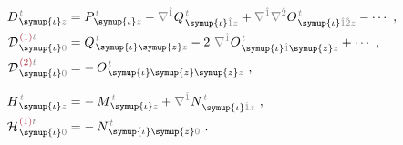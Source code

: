 \begin{subequations} \label{eq:DH^(2-0)_0=}
\begin{align}
	D^{\;\!\mathcolor{gray}{t}}_{\;\! \symup{\iota}\mathcolor{gray}{z}} &= P^{\;\!\mathcolor{gray}{t}}_{\;\! \symup{\iota}\mathcolor{gray}{z}} - \mathcolor{gray}{\nabla^{\hat{1}}} Q^{\;\!\mathcolor{gray}{t}}_{\;\! \symup{\iota} \mathcolor{gray}{\hat{1}} \mathcolor{gray}{z}} + \mathcolor{gray}{\nabla^{\hat{1}}} \mathcolor{gray}{\nabla^{\hat{2}}} O^{\;\!\mathcolor{gray}{t}}_{\;\! \symup{\iota} \mathcolor{gray}{\hat{1}\hat{2}} \mathcolor{gray}{z}} - \cdots~, \label{eq:D^(0)=} \\
	{\mathcal{D}}^{\;\!\textcolor{Maroon}{(1)}\mathcolor{gray}{t}}_{\;\! \symup{\iota}\mathcolor{gray}{0}} &= Q^{\;\!\mathcolor{gray}{t}}_{\;\! \symup{\iota}\symup{z}\mathcolor{gray}{z}} - 2~ \mathcolor{gray}{\nabla^{\hat{1}}} O^{\;\!\mathcolor{gray}{t}}_{\;\! \symup{\iota} \mathcolor{gray}{\hat{1}} \symup{z}\mathcolor{gray}{z}} + \cdots~, \label{eq:D^(1)_0=} \\
	{\mathcal{D}}^{\;\!\textcolor{Maroon}{(2)}\mathcolor{gray}{t}}_{\;\! \symup{\iota}\mathcolor{gray}{0}} &= -\hspace{0.2em} O^{\;\!\mathcolor{gray}{t}}_{\;\! \symup{\iota}\symup{z}\symup{z}\mathcolor{gray}{z}}~, \label{eq:D^(2)_0=} \\[0.7em]
	H^{\;\!\mathcolor{gray}{t}}_{\;\! \symup{\iota}\mathcolor{gray}{z}} &= -\hspace{0.2em} M^{\;\!\mathcolor{gray}{t}}_{\;\! \symup{\iota} \mathcolor{gray}{z}} + \mathcolor{gray}{\nabla^{\hat{1}}} N^{\;\!\mathcolor{gray}{t}}_{\;\! \symup{\iota} \mathcolor{gray}{\hat{1}} \mathcolor{gray}{z}}~, \label{eq:H^(0)=} \\
	{\mathcal{H}}^{\;\!\textcolor{Maroon}{(1)}\mathcolor{gray}{t}}_{\;\! \symup{\iota}\mathcolor{gray}{0}} &= -\hspace{0.2em} N^{\;\!\mathcolor{gray}{t}}_{\;\! \symup{\iota}\symup{z}\mathcolor{gray}{0}}~. \label{eq:H^(1)_0=}
\end{align}
\end{subequations}

